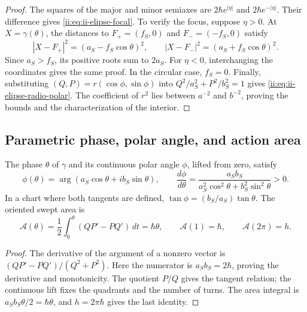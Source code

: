\begin{proof}
The squares of the major and minor semiaxes are
\(2\hbar e^{|\eta|}\) and \(2\hbar e^{-|\eta|}\). Their difference
gives \eqref{ii:eq:ii-elipse-focal}. To verify the focus, suppose
\(\eta>0\). At \(X=\gamma(\theta)\), the distances to
\(F_+=(f_S,0)\) and \(F_-=(-f_S,0)\) satisfy
\[
 |X-F_+|^2=(a_S-f_S\cos\theta)^2,\qquad
 |X-F_-|^2=(a_S+f_S\cos\theta)^2.
\]
Since \(a_S>f_S\), its positive roots sum to \(2a_S\). For \(\eta<0\), interchanging the coordinates gives the same proof. In the circular case, \(f_S=0\). Finally, substituting \((Q,P)=r(\cos\phi,\sin\phi)\) into \(Q^2/a_S^2+P^2/b_S^2=1\) gives \eqref{ii:eq:ii-elipse-radio-polar}. The coefficient of \(r^2\) lies between \(a^{-2}\) and \(b^{-2}\), proving the bounds and the characterization of the interior.
\end{proof}

\subsection{Parametric phase, polar angle, and action area}
\label{ii:sec:ii-elipse-fase-area}

\begin{proposition}
\label{ii:prop:ii-elipse-area}
The phase \(\theta\) of \(\gamma\) and its continuous polar angle
\(\phi\), lifted from zero, satisfy
\begin{equation}
 \phi(\theta)=\arg(a_S\cos\theta+i b_S\sin\theta),\qquad
 \frac{d\phi}{d\theta}
 =\frac{a_Sb_S}{a_S^2\cos^2\theta+b_S^2\sin^2\theta}>0.
 \label{ii:eq:ii-elipse-fases}
\end{equation}
In a chart where both tangents are defined, \(\tan\phi=(b_S/a_S)\tan\theta\). The oriented swept area is
\begin{equation}
 \mathcal A(\theta)=\frac12\int_0^\theta(QP'-PQ')\,dt
 =\hbar\theta,\qquad
 \mathcal A(1)=\hbar,\qquad \mathcal A(2\pi)=h.
 \label{ii:eq:ii-elipse-area-fase}
\end{equation}
\end{proposition}

\begin{proof}
The derivative of the argument of a nonzero vector is \((QP'-PQ')/(Q^2+P^2)\). Here the numerator is \(a_Sb_S=2\hbar\), proving the derivative and monotonicity. The quotient \(P/Q\) gives the tangent relation; the continuous lift fixes the quadrants and the number of turns. The area integral is \(a_Sb_S\theta/2=\hbar\theta\), and \(h=2\pi\hbar\) gives the last identity.
\end{proof}

